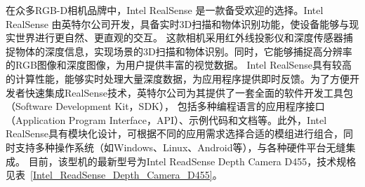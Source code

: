 
\par 在众多RGB-D相机品牌中，Intel RealSense 是一款备受欢迎的选择。Intel RealSense 由英特尔公司开发，具备实时3D扫描和物体识别功能，使设备能够与现实世界进行更自然、更直观的交互。
这款相机采用红外线投影仪和深度传感器捕捉物体的深度信息，实现场景的3D扫描和物体识别。同时，它能够捕捉高分辨率的RGB图像和深度图像，为用户提供丰富的视觉数据。
Intel
RealSense具有较高的计算性能，能够实时处理大量深度数据，为应用程序提供即时反馈。为了方便开发者快速集成RealSense技术，英特尔公司为其提供了一套全面的软件开发工具包（Software
Development Kit，SDK）， 包括多种编程语言的应用程序接口（Application Program
Interface，API）、示例代码和文档等。此外，Intel
RealSense具有模块化设计，可根据不同的应用需求选择合适的模组进行组合，同时支持多种操作系统（如Windows、Linux、Android等），与各种硬件平台无缝集成。
目前，该型机的最新型号为Intel ReadSense Depth Camera
D455，技术规格见表~\ref{Intel_ReadSense_Depth_Camera_D455}。

